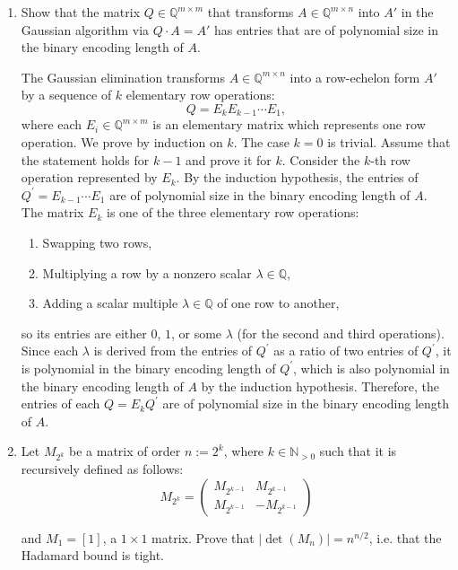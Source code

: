 \documentclass[11pt]{article}
\institute{\'Ecole Polytechnique F\'ed\'erale de Lausanne}
\newcommand{\setQ}{\mathbb{Q}}
\newcommand{\setN}{\mathbb{N}}
\begin{document}
\makeheader

\begin{enumerate}[1)]

\item Show that the matrix $Q\in\setQ^{m\times m}$ that transforms $A\in\setQ^{m\times n}$ into $A'$ in the Gaussian algorithm via $Q \cdot A = A'$ has entries that are of polynomial size in the binary encoding length of $A$.

\begin{solution}
The Gaussian elimination transforms $A \in \mathbb{Q}^{m \times n}$ into a row-echelon form $A'$ by a sequence of $k$ elementary row operations:
\[
Q = E_k E_{k-1} \cdots E_1,
\]
where each $E_i \in \mathbb{Q}^{m \times m}$ is an elementary matrix which represents one row operation.
We prove by induction on $k$. The case $k=0$ is trivial.
Assume that the statement holds for $k-1$ and prove it for $k$. Consider the $k$-th row operation represented by $E_k$. By the induction hypothesis, the entries of $Q^\prime=E_{k-1} \cdots E_1$ are of polynomial size in the binary encoding length of $A$. 
The matrix $E_k$ is one of the three elementary row operations:
\begin{enumerate}
    \item Swapping two rows,
    \item Multiplying a row by a nonzero scalar $\lambda \in \mathbb{Q}$,
    \item Adding a scalar multiple $\lambda \in \mathbb{Q}$ of one row to another,
\end{enumerate}
so its entries are either $0$, $1$, or some $\lambda$ (for the second and third operations). 
Since each $\lambda$ is derived from the entries of $Q^\prime$ as a ratio of two entries of $Q^\prime$, it is polynomial in the binary encoding length of $Q^\prime$, which is also polynomial in the binary encoding length of $A$ by the induction hypothesis.
Therefore, the entries of each $Q=E_k Q^\prime$ are of polynomial size in the binary encoding length of $A$.
\end{solution}

\item Let $M_{2^k}$ be a matrix of order $n:= 2^k$, where $k∈\setN_{>0}$ such that it is recursively defined as follows:
$$M_{2^k} = \begin{pmatrix} M_{2^{k−1}} &  M_{2^{k−1}} \\ M_{2^{k−1}} & −M_{2^{k−1}} \end{pmatrix} $$

and $M_1 = [1]$, a $1 \times 1$ matrix. Prove that $|\det(M_n)|= n^{n/2}$, i.e. that the Hadamard bound is tight.


\end{enumerate}
\end{document}

